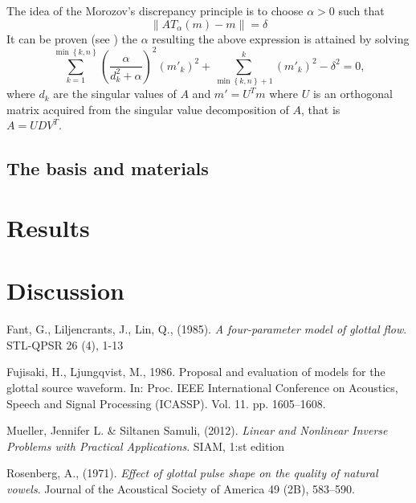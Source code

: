 \documentclass[12pt,a4]{article}
\newcommand{\lnorm}{\left\|}
\newcommand{\rnorm}{\right\|}
\begin{document}
The idea of the Morozov's discrepancy principle is to choose $\alpha > 0$ such that
\begin{equation}
\lnorm AT_\alpha(m) - m \rnorm = \delta
\end{equation}
It can be proven (see \cite{samu}) the $\alpha$ resulting the above expression is attained by solving
\begin{equation}
\sum_{k=1}^{\min\left\{k,n\right\}}\left(\frac{\alpha}{d_k^2+\alpha}\right)^2 \left(m'_k\right)^2 + \sum_{\min\left\{k,n\right\} + 1}^k \left(m'_k\right)^2 - \delta^2 = 0,
\end{equation}
where $d_k$ are the singular values of $A$ and $m' = U^Tm$ where $U$ is an orthogonal matrix acquired from the singular value decomposition of $A$, that is \\$A=UDV^T$.


\subsection{The basis and materials}\label{sec:basis}



\section{Results}\label{sec:results}


\section{Discussion}\label{sec:discussion}

\newpage
\begin{thebibliography}{9}

    Fant, G., Liljencrants, J., Lin, Q., (1985).
    \emph{A four-parameter model of glottal flow}.
    STL-QPSR 26 (4), 1-13
    
    Fujisaki, H., Ljungqvist, M., 1986.
    Proposal and evaluation of models for the glottal source waveform.
    In: Proc. IEEE International Conference on Acoustics, Speech and Signal Processing (ICASSP). Vol. 11. pp. 1605–1608.
    
	Mueller, Jennifer L. \& Siltanen Samuli, (2012).
	\emph{Linear and Nonlinear Inverse Problems with Practical Applications}.
	SIAM, 1:st edition

    Rosenberg, A., (1971).
    \emph{Effect of glottal pulse shape on the quality of natural vowels}.
    Journal of the Acoustical Society of America 49 (2B), 583–590.

\end{thebibliography}
\end{document}
